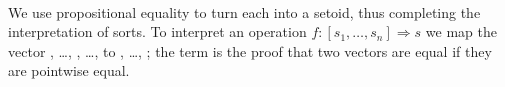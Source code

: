 \begin{code}
  \>[2]\AgdaSpace{}%
  \AgdaSpace{}%
  \AgdaSymbol{\{}\AgdaSpace{}%
  \AgdaSymbol{:}\AgdaSpace{}%
  \AgdaSpace{}%
  \AgdaSymbol{\}}\AgdaSpace{}%
  \AgdaSymbol{:}\AgdaSpace{}%
\AgdaSymbol{(}\AgdaSpace{}%
\AgdaSymbol{:}\AgdaSpace{}%
\AgdaSpace{}%
\AgdaSymbol{)}\AgdaSpace{}%
\AgdaSpace{}%
\AgdaSpace{}%
\<%
\\
\>[2][@{}l@{\AgdaIndent{0}}]%
\>[4]\AgdaSpace{}%
\AgdaSymbol{:}\AgdaSpace{}%
%
\>[14]\AgdaSymbol{\{}\AgdaSpace{}%
\AgdaSymbol{\}}\AgdaSpace{}%
%
\>[24]\AgdaSymbol{(}\AgdaSpace{}%
\AgdaSymbol{:}\AgdaSpace{}%
\AgdaSpace{}%
\AgdaSpace{}%
\AgdaSymbol{(}\AgdaSpace{}%
\AgdaOperator{\AgdaInductiveConstructor{,}}\AgdaSpace{}%
\AgdaSymbol{))}\AgdaSpace{}%
\AgdaSpace{}%
\AgdaSymbol{(}\AgdaSpace{}%
\AgdaSpace{}%
\AgdaSymbol{)}\AgdaSpace{}%
\AgdaSpace{}%
\AgdaSpace{}%
\<%
\end{code}

\noindent We use propositional equality to turn each  into a
setoid, thus completing the interpretation of sorts. To interpret an
operation $f \colon [s_1,\ldots,s_n] \Rightarrow s$ we map the vector
   , \ldots , 
\AgdaSymbol{:}  
\AgdaInductiveConstructor{[}
   , \ldots , 
  \AgdaInductiveConstructor{]} to
 
   , \ldots , 
  ; the term  is the
  proof that two vectors are equal if they are pointwise equal.

